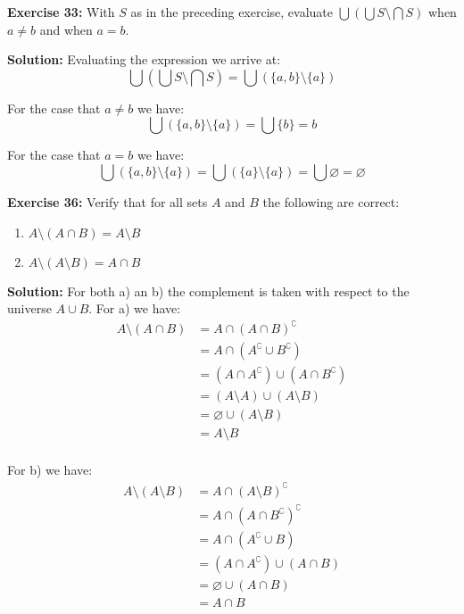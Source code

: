 \documentclass{article}
\begin{document}
\bigskip

\noindent\textbf{Exercise 33:} With $S$ as in the preceding exercise, evaluate $\bigcup(\bigcup S \setminus\bigcap S)$ when $a \not= b$ and when $a = b$.
\bigskip

\noindent\textbf{Solution:} Evaluating the expression we arrive at:
\begin{equation*}
    \bigcup\left(\bigcup S \setminus\bigcap S\right)=\bigcup\left(\{a,b\} \setminus\{a\}\right)
\end{equation*}

For the case that $a\not= b$ we have:
\begin{equation*}
    \bigcup\left(\{a,b\} \setminus\{a\}\right)=\bigcup\{b\}=b
\end{equation*}

For the case that $a = b$ we have:
\begin{equation*}
    \bigcup\left(\{a,b\} \setminus\{a\}\right)=\bigcup\left(\{a\} \setminus\{a\}\right)=\bigcup\varnothing=\varnothing
\end{equation*}

\bigskip

\noindent\textbf{Exercise 36:} Verify that for all sets $A$ and $B$ the following are correct:
\begin{enumerate}[label=\alph*)]
    \item $A\setminus(A\cap B) = A\setminus B$
    \item $A\setminus(A\setminus B) = A\cap B$
\end{enumerate}
\smallskip

\noindent\textbf{Solution:} For both a) an b) the complement is taken with respect to the universe $A\cup B$. For a) we have:
\begin{align*}
    A\setminus(A\cap B)&=A\cap(A\cap B)^\complement\tag{relative complement}\\
    &=A\cap(A^\complement\cup B^\complement)\tag{DeMorgan's Law}\\
    &=(A\cap A^\complement)\cup (A\cap B^\complement)\tag{distributivity of intersection}\\
    &=(A\setminus A)\cup (A\setminus B)\tag{relative complement}\\
    &=\varnothing\cup (A\setminus B)\\
    &=A\setminus B\\
\end{align*}

For b) we have:
\begin{align*}
    A\setminus(A\setminus B)&=A\cap(A\setminus B)^\complement\tag{relative complement}\\
    &=A\cap(A\cap B^\complement)^\complement\tag{relative complement}\\
    &=A\cap(A^\complement\cup B)\tag{DeMorgan's Law}\\
    &=(A\cap A^\complement)\cup (A\cap B)\tag{distributivity of intersection}\\
    &=\varnothing\cup (A\cap B)\\
    &=A\cap B\\
\end{align*}
\end{document}
